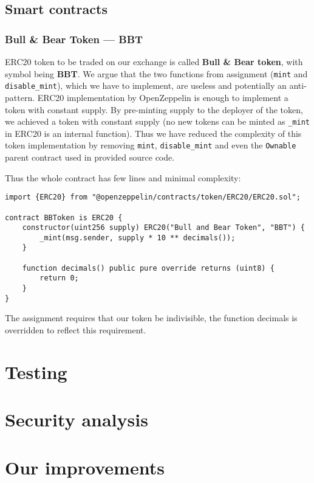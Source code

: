 \documentclass[11pt,a4paper]{article}
\begin{document}
\subsection*{Smart contracts}

\subsubsection*{Bull \& Bear Token --- BBT}

ERC20 token to be traded on our exchange is called \textbf{Bull \& Bear token},
with symbol being \textbf{BBT}. We argue that the two functions from assignment
(\texttt{mint} and \texttt{disable\_mint}), which we have to implement, are
useless and potentially an anti-pattern. ERC20 implementation by
OpenZeppelin is enough to implement a token with constant supply.
By pre-minting supply to the deployer of the token, we achieved a token
with constant supply (no new tokens can be minted as \texttt{\_mint} in ERC20
is an internal function\cite{openzeppelinERC20}). Thus we have reduced the
complexity of this token implementation by removing \texttt{mint}, \texttt{disable\_mint}
and even the \texttt{Ownable} parent contract used in provided source code.

Thus the whole contract has few lines and minimal complexity:

\begin{verbatim}
import {ERC20} from "@openzeppelin/contracts/token/ERC20/ERC20.sol";

contract BBToken is ERC20 {
    constructor(uint256 supply) ERC20("Bull and Bear Token", "BBT") {
        _mint(msg.sender, supply * 10 ** decimals());
    }

    function decimals() public pure override returns (uint8) {
        return 0;
    }
}
\end{verbatim}

The assignment requires that our token be indivisible, the function
decimals is overridden to reflect this requirement.

\section{Testing}

\section{Security analysis}

\section{Our improvements}
\end{document}
